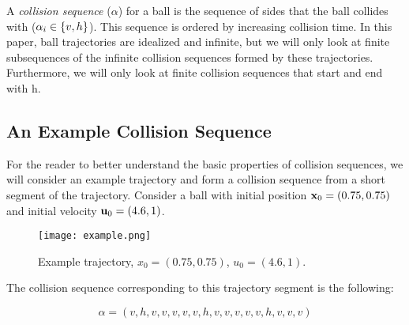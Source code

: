 \begin{definition}
  A \emph{collision sequence} ($\alpha$) for a ball is the sequence of sides that the ball collides with ($\alpha_i \in \cbracket{v, h}$). This sequence is ordered by increasing collision time. In this paper, ball trajectories are idealized and infinite, but we will only look at finite subsequences of the infinite collision sequences formed by these trajectories. Furthermore, we will only look at finite collision sequences that start and end with h.
\end{definition}

\subsection{An Example Collision Sequence}

For the reader to better understand the basic properties of collision sequences, we will consider an example trajectory and form a collision sequence from a short segment of the trajectory. Consider a ball with initial position $\mathbf{x}_0 = (0.75, 0.75)$ and initial velocity $\mathbf{u}_0 = (4.6, 1)$.

\begin{figure}[H]
  \begin{center}
    \texttt{[image: example.png]}
  \end{center}
  \vspace{-.2in} %
  \caption{\label{fig:example}Example trajectory, $x_0 = (0.75, 0.75)$, $u_0 = (4.6, 1)$.}
\end{figure}

The collision sequence corresponding to this trajectory segment is the following:

\begin{equation}
	\alpha = (v, h, v, v, v, v, v, h, v, v, v, v, v, h, v, v, v)
\end{equation}
